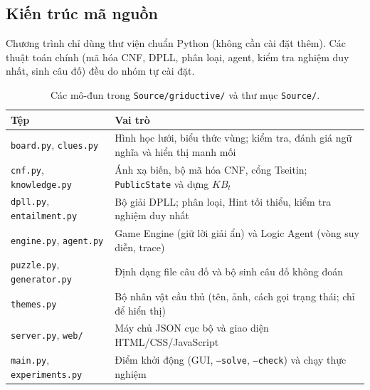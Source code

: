 \documentclass{article}
\newcommand{\code}[1]{\texttt{#1}}
\newcommand{\KB}{\mathit{KB}}
\begin{document}
\subsection{Kiến trúc mã nguồn}
Chương trình chỉ dùng thư viện chuẩn Python (không cần cài đặt thêm). Các thuật toán chính (mã hóa CNF, DPLL, phân loại, agent, kiểm tra nghiệm duy nhất, sinh câu đố) đều do nhóm tự cài đặt.

\begin{table}[H]
\centering\small
\renewcommand{\arraystretch}{1.2}
\begin{tabularx}{\textwidth}{l X}
\toprule
\textbf{Tệp} & \textbf{Vai trò} \\
\midrule
\code{board.py}, \code{clues.py} & Hình học lưới, biểu thức vùng; kiểm tra, đánh giá ngữ nghĩa và hiển thị manh mối \\
\code{cnf.py}, \code{knowledge.py} & Ánh xạ biến, bộ mã hóa CNF, cổng Tseitin; \code{PublicState} và dựng $\KB_t$ \\
\code{dpll.py}, \code{entailment.py} & Bộ giải DPLL; phân loại, Hint tối thiểu, kiểm tra nghiệm duy nhất \\
\code{engine.py}, \code{agent.py} & Game Engine (giữ lời giải ẩn) và Logic Agent (vòng suy diễn, trace) \\
\code{puzzle.py}, \code{generator.py} & Định dạng file câu đố và bộ sinh câu đố không đoán \\
\code{themes.py} & Bộ nhân vật cầu thủ (tên, ảnh, cách gọi trạng thái; chỉ để hiển thị) \\
\code{server.py}, \code{web/} & Máy chủ JSON cục bộ và giao diện HTML/CSS/JavaScript \\
\code{main.py}, \code{experiments.py} & Điểm khởi động (GUI, \code{--solve}, \code{--check}) và chạy thực nghiệm \\
\bottomrule
\end{tabularx}
\caption{Các mô-đun trong \code{Source/griductive/} và thư mục \code{Source/}.}
\end{table}
\end{document}
